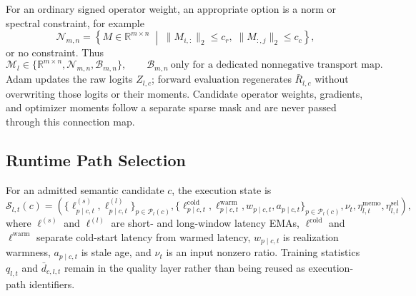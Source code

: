 \documentclass{article}
\begin{document}
For an ordinary signed operator weight, an appropriate option is a norm or
spectral constraint, for example
\begin{equation}
\mathcal{N}_{m,n}
=\left\{
M\in\mathbb{R}^{m\times n}
\;\middle|\;
\|M_{i,:}\|_2\le c_r,\;
\|M_{:,j}\|_2\le c_c
\right\},
\label{eq:achf-norm-constraint}
\end{equation}
or no constraint. Thus
\begin{equation}
\mathcal{M}_l\in
\{\mathbb{R}^{m\times n},\mathcal{N}_{m,n},\mathcal{B}_{m,n}\},
\qquad
\mathcal{B}_{m,n}\ \text{only for a dedicated nonnegative transport map}.
\label{eq:achf-projection-choice}
\end{equation}
Adam updates the raw logits $Z_{l,c}$; forward evaluation regenerates
$\bar R_{l,c}$ without overwriting those logits or their moments. Candidate
operator weights, gradients, and optimizer moments follow a separate sparse
mask and are never passed through this connection map.

\subsection{Runtime Path Selection}

For an admitted semantic candidate $c$, the execution state is
\begin{equation}
\mathcal{S}_{l,t}(c)=
\left(
\{\ell_{p\mid c,t}^{(s)},\ell_{p\mid c,t}^{(l)}\}_{p\in\mathcal{P}_l(c)},
\{\ell_{p\mid c,t}^{\mathrm{cold}},\ell_{p\mid c,t}^{\mathrm{warm}},
w_{p\mid c,t},a_{p\mid c,t}\}_{p\in\mathcal{P}_l(c)},
\nu_t,
\eta^{\mathrm{memo}}_{l,t},
\eta^{\mathrm{sel}}_{l,t}
\right),
\label{eq:achf-runtime-state}
\end{equation}
where $\ell^{(s)}$ and $\ell^{(l)}$ are short- and long-window latency EMAs,
$\ell^{\mathrm{cold}}$ and $\ell^{\mathrm{warm}}$ separate cold-start latency
from warmed latency, $w_{p\mid c,t}$ is realization warmness,
$a_{p\mid c,t}$ is stale age, and $\nu_t$ is an input nonzero ratio. Training
statistics $q_{l,t}$ and $\bar d_{c,l,t}$ remain in the quality layer rather
than being reused as execution-path identifiers.
\end{document}
